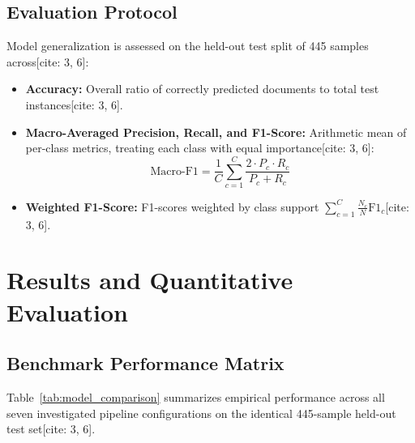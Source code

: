 \documentclass[11pt,a4paper]{article}
\begin{document}
	\subsection{Evaluation Protocol}
	Model generalization is assessed on the held-out test split of 445 samples across[cite: 3, 6]:
	\begin{itemize}[leftmargin=1.5em, itemsep=0.3em]
		\item \textbf{Accuracy:} Overall ratio of correctly predicted documents to total test instances[cite: 3, 6].
		\item \textbf{Macro-Averaged Precision, Recall, and F1-Score:} Arithmetic mean of per-class metrics, treating each class with equal importance[cite: 3, 6]:
		\begin{equation}
			\text{Macro-F1} = \frac{1}{C} \sum_{c=1}^{C} \frac{2 \cdot P_c \cdot R_c}{P_c + R_c}
			\label{eq:macro_f1}
		\end{equation}
		\item \textbf{Weighted F1-Score:} F1-scores weighted by class support $\sum_{c=1}^C \frac{N_c}{N} \text{F1}_c$[cite: 3, 6].
	\end{itemize}
	
	\section{Results and Quantitative Evaluation}
	\label{sec:results}
	
	\subsection{Benchmark Performance Matrix}
	Table~\ref{tab:model_comparison} summarizes empirical performance across all seven investigated pipeline configurations on the identical 445-sample held-out test set[cite: 3, 6].
	
\end{document}
